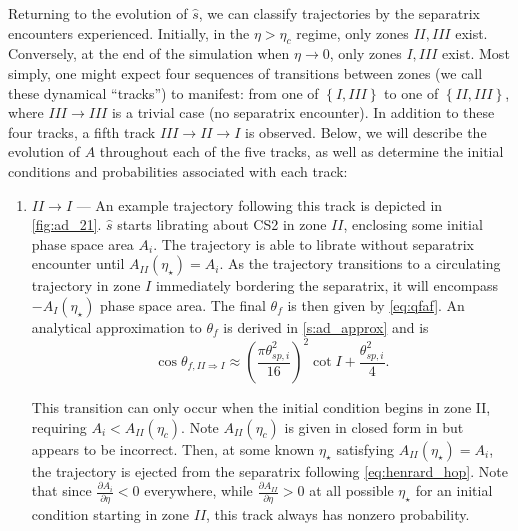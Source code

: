 \documentclass[
        fleqn,
        usenatbib,
        referee,
    ]{mnras}
\newcommand*{\pd}[2]{\frac{\partial#1}{\partial#2}}
\newcommand*{\p}[1]{\left(#1\right)}
\newcommand*{\z}[1]{\left\{#1\right\}}
\begin{document}
Returning to the evolution of $\hat{s}$, we can classify trajectories by the
separatrix encounters experienced. Initially, in the $\eta > \eta_c$ regime,
only zones $II, III$ exist. Conversely, at the end of the simulation when $\eta
\to 0$, only zones $I, III$ exist. Most simply, one might expect four sequences
of transitions between zones (we call these dynamical ``tracks'') to manifest:
from one of $\z{I, III}$ to one of $\z{II, III}$, where $III \to III$ is a
trivial case (no separatrix encounter). In addition to these four tracks, a
fifth track $III \to II \to I$ is observed. Below, we will describe the
evolution of $A$ throughout each of the five tracks, as well as determine the
initial conditions and probabilities associated with each track:
\begin{enumerate}
    \item $II \to I$ --- An example trajectory following this track is depicted
        in \autoref{fig:ad_21}. $\hat{s}$ starts librating about CS2 in zone
        $II$, enclosing some initial phase space area $A_i$. The trajectory is
        able to librate without separatrix encounter until $A_{II}(\eta_\star) =
        A_i$. As the trajectory transitions to a circulating trajectory in zone
        $I$ immediately bordering the separatrix, it will encompass
        $-A_I(\eta_\star)$ phase space area. The final $\theta_f$ is then given
        by \autoref{eq:qfaf}. An analytical approximation to $\theta_f$ is
        derived in \autoref{s:ad_approx} and is
        \begin{equation}
            \cos \theta_{f, II \Rightarrow I} \approx
                \p{\frac{\pi \theta_{sp, i}^2}{16}}^2 \cot I
                    + \frac{\theta_{sp, i}^2}{4}.\label{eq:qf_21_approx}
        \end{equation}

        This transition can only occur when the initial condition begins in zone
        II, requiring $A_i < A_{II}(\eta_c)$. Note $A_{II}(\eta_c)$ is given in
        closed form in \citet{ward2004I} but appears to be incorrect. Then, at
        some known $\eta_\star$ satisfying $A_{II}(\eta_\star) = A_i$, the
        trajectory is ejected from the separatrix following
        \autoref{eq:henrard_hop}. Note that since $\pd{A_i}{\eta} < 0$
        everywhere, while $\pd{A_{II}}{\eta} > 0$ at all possible $\eta_\star$
        for an initial condition starting in zone $II$, this track always has
        nonzero probability.


\end{enumerate}
\end{document}
